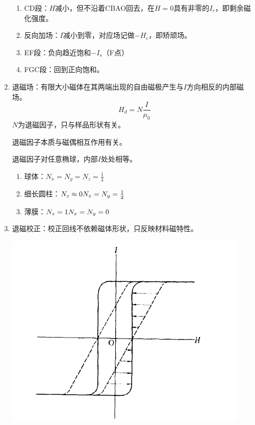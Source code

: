 \begin{enumerate}
\begin{center}
    \end{center}
    \begin{enumerate}
        \item CD段：$H$减小，但不沿着CBAO回去，在$H=0$具有非零的$I_r$，即剩余磁化强度。
        \item 反向加场：$I$减小到零，对应场记做$-H_c$，即矫顽场。
        \item EF段：负向趋近饱和$-I_s$（F点）
        \item FGC段：回到正向饱和。
    \end{enumerate}

    \item 退磁场：有限大小磁体在其两端出现的自由磁极产生与$I$方向相反的内部磁场。
    \[ H_d = N\frac{I}{\mu_0} \]
    $N$为退磁因子，只与样品形状有关。

    退磁因子本质与磁偶相互作用有关。
    \begin{proposition}
        退磁因子对任意椭球，内部$I$处处相等。
        \begin{enumerate}
            \item 球体：$N_x=N_y=N_z=\frac{1}{3}$
            \item 细长圆柱：$N_z \approx 0 \\ N_x=N_y=\frac{1}{2}$
            \item 薄膜：$N_z = 1 \\ N_x=N_y=0$
        \end{enumerate}
    \end{proposition}

    \item 退磁校正：校正回线不依赖磁体形状，只反映材料磁特性。
    \begin{center}
        \includegraphics[scale=0.7]{images/1_3.png}
    \end{center}


\end{enumerate}
